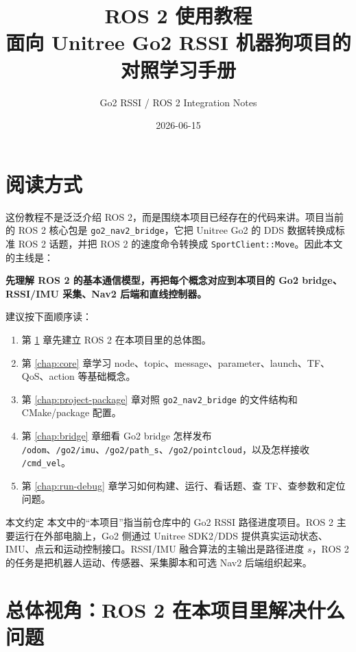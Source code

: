 \documentclass[UTF8,11pt,a4paper,openany]{ctexrep}
\title{
  \Huge ROS 2 使用教程\\
  \Large 面向 Unitree Go2 RSSI 机器狗项目的对照学习手册
}
\author{Go2 RSSI / ROS 2 Integration Notes}
\date{2026-06-15}
\newcommand{\code}[1]{\nolinkurl{#1}}
\newcommand{\pkg}[1]{\nolinkurl{#1}}
\newcommand{\topic}[1]{\nolinkurl{#1}}
\begin{document}
\maketitle
\tableofcontents

\chapter*{阅读方式}

这份教程不是泛泛介绍 ROS 2，而是围绕本项目已经存在的代码来讲。项目当前的 ROS 2 核心包是 \pkg{go2_nav2_bridge}，它把 Unitree Go2 的 DDS 数据转换成标准 ROS 2 话题，并把 ROS 2 的速度命令转换成 \code{SportClient::Move}。因此本文的主线是：

\begin{center}
  \textbf{先理解 ROS 2 的基本通信模型，再把每个概念对应到本项目的 Go2 bridge、RSSI/IMU 采集、Nav2 后端和直线控制器。}
\end{center}

建议按下面顺序读：

\begin{enumerate}
  \item 第 \ref{chap:big-picture} 章先建立 ROS 2 在本项目里的总体图。
  \item 第 \ref{chap:core} 章学习 node、topic、message、parameter、launch、TF、QoS、action 等基础概念。
  \item 第 \ref{chap:project-package} 章对照 \pkg{go2_nav2_bridge} 的文件结构和 CMake/package 配置。
  \item 第 \ref{chap:bridge} 章细看 Go2 bridge 怎样发布 \topic{/odom}、\topic{/go2/imu}、\topic{/go2/path_s}、\topic{/go2/pointcloud}，以及怎样接收 \topic{/cmd_vel}。
  \item 第 \ref{chap:run-debug} 章学习如何构建、运行、看话题、查 TF、查参数和定位问题。
\end{enumerate}

\begin{notebox}{本文约定}
本文中的“本项目”指当前仓库中的 Go2 RSSI 路径进度项目。ROS 2 主要运行在外部电脑上，Go2 侧通过 Unitree SDK2/DDS 提供真实运动状态、IMU、点云和运动控制接口。RSSI/IMU 融合算法的主输出是路径进度 \(s\)，ROS 2 的任务是把机器人运动、传感器、采集脚本和可选 Nav2 后端组织起来。
\end{notebox}

\chapter{总体视角：ROS 2 在本项目里解决什么问题}
\label{chap:big-picture}
\end{document}
